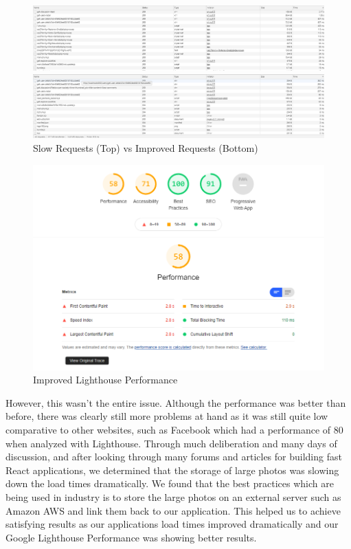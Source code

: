 \begin{figure}[H]
  \centering
  \includegraphics[scale=0.4]{img/slow_network_times.jpg}
  
  \newline
  
  \includegraphics[scale=0.4]{img/improved_network_times.jpg}
  \caption{Slow Requests (Top) vs Improved Requests (Bottom)}
  \label{fig:slow_network}
\end{figure}

\begin{figure}[H]
  \centering
  \includegraphics[scale=0.65]{img/improved_lighthouse.jpg}
  \caption{Improved Lighthouse Performance}
  \label{fig:improved_lighthouse}
\end{figure}

\newline

However, this wasn't the entire issue. Although the performance was better than before, there was clearly still more problems at hand as it was still quite low comparative to other websites, such as Facebook which had a performance of 80 when analyzed with Lighthouse. Through much deliberation and many days of discussion, and after looking through many forums and articles for building fast React applications, we determined that the storage of large photos was slowing down the load times dramatically. We found that the best practices which are being used in industry is to store the large photos on an external server such as Amazon AWS and link them back to our application. This helped us to achieve satisfying results as our applications load times improved dramatically and our Google Lighthouse Performance was showing better results.

